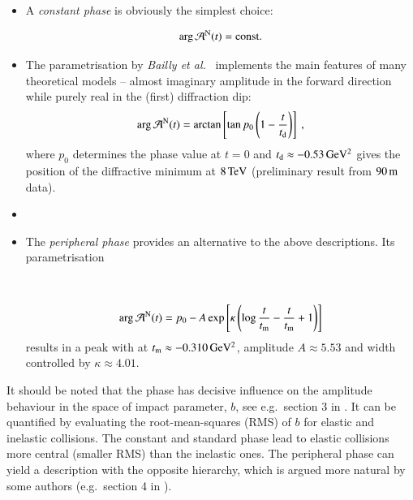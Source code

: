 \begin{itemize}

\item A {\it constant phase} is obviously the simplest choice:

\begin{equation}
\label{eq:nuc phase const}
\arg {\cal A}^{\rm N}(t) = \hbox{const.}
\end{equation}

\item The parametrisation by {\em Bailly et al.}~\cite{bailly87} implements the main features of many theoretical models -- almost imaginary amplitude in the forward direction while purely real in the (first) diffraction dip:
\begin{equation}
\label{eq:nuc phase std}
	\arg {\cal A}^{\rm N}(t) = \arctan \left[ \tan p_0 \left(1 - {t\over t_{\rm d}} \right) \right]\ ,
\end{equation}
where $p_0$ determines the phase value at $t=0$ and $t_{\rm d} \approx -0.53\,{\rm GeV^2}$ gives the position of the diffractive minimum at $8\,{\rm TeV}$ (preliminary result from $90\,{\rm m}$ data).

\item {}

\item The {\it peripheral phase} \cite{kl94}  provides an alternative to the above descriptions. Its parametrisation

\\

\begin{equation}
\label{eq:nuc phase per}
\arg {\cal A}^{\rm N}(t) = p_0 - A \exp\left[ \kappa \left( \log {t\over t_{\rm m}} - {t\over t_{\rm m}} + 1 \right) \right]
\end{equation}
results in a peak with at $t_{\rm m} \approx -0.310\,{\rm GeV^2}$, amplitude $A \approx 5.53$ and width controlled by $\kappa \approx 4.01$.

\end{itemize}

It should be noted that the phase has decisive influence on the amplitude behaviour in the space of impact parameter, $b$, see e.g.~section 3 in \cite{klk02}. It can be quantified by evaluating the root-mean-squares (RMS) of $b$ for elastic and inelastic collisions. The constant and standard phase lead to elastic collisions more central (smaller RMS) than the inelastic ones. The peripheral phase can yield a description with the opposite hierarchy, which is argued more natural by some authors (e.g.~section 4 in \cite{kl96}).

